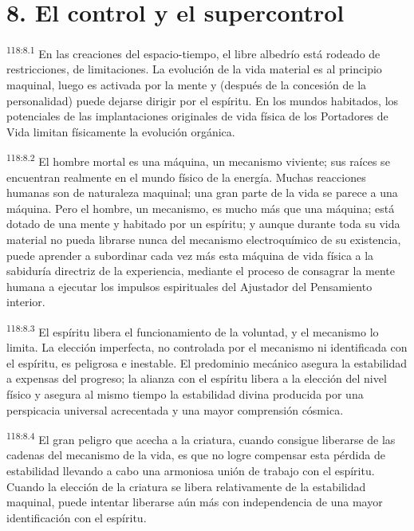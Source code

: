\documentclass[twoside, 11pt]{book}
\begin{document}
\section*{8. El control y el supercontrol}
\par
\textsuperscript{118:8.1} En las creaciones del espacio-tiempo, el libre albedrío está rodeado de restricciones, de limitaciones. La evolución de la vida material es al principio maquinal, luego es activada por la mente y (después de la concesión de la personalidad) puede dejarse dirigir por el espíritu. En los mundos habitados, los potenciales de las implantaciones originales de vida física de los Portadores de Vida limitan físicamente la evolución orgánica.

\par
\textsuperscript{118:8.2} El hombre mortal es una máquina, un mecanismo viviente; sus raíces se encuentran realmente en el mundo físico de la energía. Muchas reacciones humanas son de naturaleza maquinal; una gran parte de la vida se parece a una máquina. Pero el hombre, un mecanismo, es mucho más que una máquina; está dotado de una mente y habitado por un espíritu; y aunque durante toda su vida material no pueda librarse nunca del mecanismo electroquímico de su existencia, puede aprender a subordinar cada vez más esta máquina de vida física a la sabiduría directriz de la experiencia, mediante el proceso de consagrar la mente humana a ejecutar los impulsos espirituales del Ajustador del Pensamiento interior.

\par
\textsuperscript{118:8.3} El espíritu libera el funcionamiento de la voluntad, y el mecanismo lo limita. La elección imperfecta, no controlada por el mecanismo ni identificada con el espíritu, es peligrosa e inestable. El predominio mecánico asegura la estabilidad a expensas del progreso; la alianza con el espíritu libera a la elección del nivel físico y asegura al mismo tiempo la estabilidad divina producida por una perspicacia universal acrecentada y una mayor comprensión cósmica.

\par
\textsuperscript{118:8.4} El gran peligro que acecha a la criatura, cuando consigue liberarse de las cadenas del mecanismo de la vida, es que no logre compensar esta pérdida de estabilidad llevando a cabo una armoniosa unión de trabajo con el espíritu. Cuando la elección de la criatura se libera relativamente de la estabilidad maquinal, puede intentar liberarse aún más con independencia de una mayor identificación con el espíritu.
\end{document}
